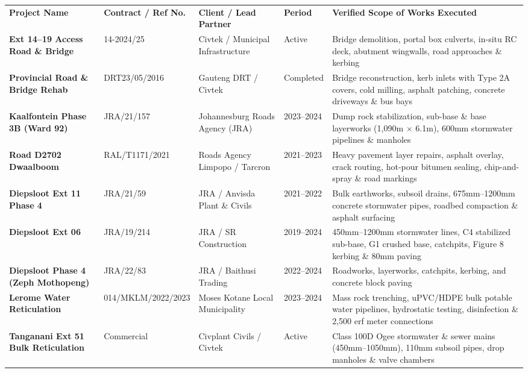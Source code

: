 {\fontsize{6.8pt}{8.4pt}\selectfont
\renewcommand{\arraystretch}{1.16}
\begin{tabularx}{\textwidth}{@{}p{3.2cm} p{2.2cm} p{2.6cm} p{1.3cm} X@{}}
\rowcolor{mhnavy}
{\color{white}\bfseries Project Name} & {\color{white}\bfseries Contract / Ref No.} & {\color{white}\bfseries Client / Lead Partner} & {\color{white}\bfseries Period} & {\color{white}\bfseries Verified Scope of Works Executed} \\
\rowcolor{mhbluelight}
\bfseries Ext 14--19 Access Road \& Bridge & 14-2024/25 & Civtek / Municipal Infrastructure & Active & Bridge demolition, portal box culverts, in-situ RC deck, abutment wingwalls, road approaches \& kerbing \\
\bfseries Provincial Road \& Bridge Rehab & DRT23/05/2016 & Gauteng DRT / Civtek & Completed & Bridge reconstruction, kerb inlets with Type 2A covers, cold milling, asphalt patching, concrete driveways \& bus bays \\
\rowcolor{mhbluelight}
\bfseries Kaalfontein Phase 3B (Ward 92) & JRA/21/157 & Johannesburg Roads Agency (JRA) & 2023--2024 & Dump rock stabilization, sub-base \& base layerworks (1,090m $\times$ 6.1m), 600mm stormwater pipelines \& manholes \\
\bfseries Road D2702 Dwaalboom & RAL/T1171/2021 & Roads Agency Limpopo / Tarcron & 2021--2023 & Heavy pavement layer repairs, asphalt overlay, crack routing, hot-pour bitumen sealing, chip-and-spray \& road markings \\
\rowcolor{mhbluelight}
\bfseries Diepsloot Ext 11 Phase 4 & JRA/21/59 & JRA / Anvisda Plant \& Civils & 2021--2022 & Bulk earthworks, subsoil drains, 675mm--1200mm concrete stormwater pipes, roadbed compaction \& asphalt surfacing \\
\bfseries Diepsloot Ext 06 & JRA/19/214 & JRA / SR Construction & 2019--2024 & 450mm--1200mm stormwater lines, C4 stabilized sub-base, G1 crushed base, catchpits, Figure 8 kerbing \& 80mm paving \\
\rowcolor{mhbluelight}
\bfseries Diepsloot Phase 4 (Zeph Mothopeng) & JRA/22/83 & JRA / Baithusi Trading & 2022--2024 & Roadworks, layerworks, catchpits, kerbing, and concrete block paving \\
\bfseries Lerome Water Reticulation & 014/MKLM/2022/2023 & Moses Kotane Local Municipality & 2023--2024 & Mass rock trenching, uPVC/HDPE bulk potable water pipelines, hydrostatic testing, disinfection \& 2,500 erf meter connections \\
\rowcolor{mhbluelight}
\bfseries Tanganani Ext 51 Bulk Reticulation & Commercial & Civplant Civils / Civtek & Active & Class 100D Ogee stormwater \& sewer mains (450mm--1050mm), 110mm subsoil pipes, drop manholes \& valve chambers \\

\end{tabularx}}
